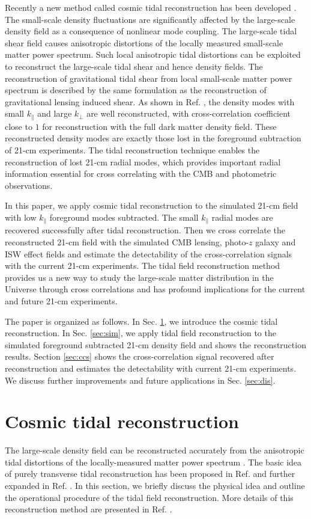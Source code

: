\documentclass[prd,superscriptaddress,floatfix,notitlepage,nofootinbib,reprint]{revtex4-1}
\newcommand{\kpa}{k_\parallel}
\newcommand{\kpe}{k_\perp}
\begin{document}
Recently a new method called cosmic tidal reconstruction has been developed
\cite{2012Tides,2016Tides}. 
The small-scale density fluctuations are significantly affected by the 
large-scale density field as a consequence of nonlinear mode coupling.
The large-scale tidal shear field causes anisotropic distortions of the locally
measured small-scale matter power spectrum. 
Such local anisotropic tidal distortions can be exploited to reconstruct the 
large-scale tidal shear and hence density fields.
The reconstruction of gravitational tidal shear from local small-scale matter 
power spectrum is described by the same formulation as the reconstruction of 
gravitational lensing induced shear. 
As shown in Ref. \cite{2016Tides}, the density modes with small $\kpa$ 
and large $\kpe$ are well reconstructed, with cross-correlation coefficient
close to $1$ for reconstruction with the full dark matter density field.
These reconstructed density modes are exactly those lost in the foreground 
subtraction of 21-cm experiments. 
The tidal reconstruction technique enables the reconstruction of lost 21-cm 
radial modes, which provides important radial information essential for cross 
correlating with the CMB and photometric observations.

In this paper, we apply cosmic tidal reconstruction to the simulated 21-cm 
field with low $\kpa$ foreground modes subtracted. The small $\kpa$ radial 
modes are recovered successfully after tidal reconstruction.
Then we cross correlate the reconstructed 21-cm field with the simulated CMB 
lensing, photo-$z$ galaxy and ISW effect fields and estimate the detectability
of the cross-correlation signals with the current 21-cm experiments.
The tidal field reconstruction method provides us a new way to study the 
large-scale matter distribution in the Universe through cross correlations 
and has profound implications for the current and future 21-cm experiments.

The paper is organized as follows.
In Sec. \ref{sec:rec}, we introduce the cosmic tidal reconstruction.
In Sec. \ref{sec:sim}, we apply tidal field reconstruction to the simulated 
foreground subtracted 21-cm density field and shows the reconstruction results.
Section \ref{sec:ccs} shows the cross-correlation signal recovered after
reconstruction and estimates the detectability with current 21-cm experiments.
We discuss further improvements and future applications in Sec. \ref{sec:dis}.


\section{Cosmic tidal reconstruction}
\label{sec:rec}
The large-scale density field can be reconstructed accurately from the 
anisotropic tidal distortions of the locally-measured matter power spectrum
\cite{2012Tides,2016Tides}.
The basic idea of purely transverse tidal reconstruction has been proposed in 
Ref. \cite{2012Tides} and further expanded in Ref. \cite{2016Tides}.
In this section, we briefly discuss the physical idea and outline the 
operational procedure of the tidal field reconstruction. More details of this 
reconstruction method are presented in Ref. \cite{2016Tides}.
\end{document}
